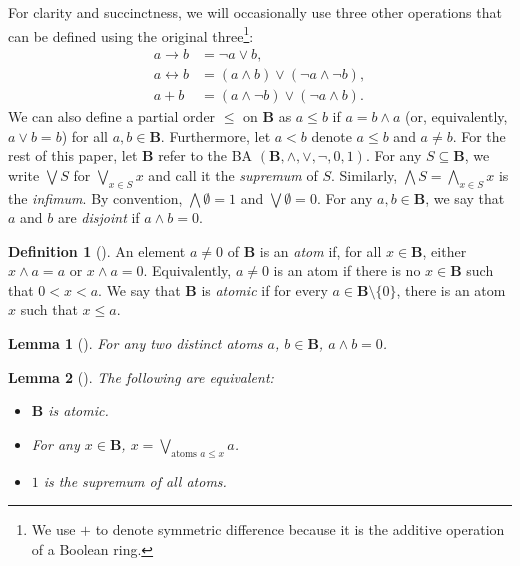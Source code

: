 \documentclass{article}
\newtheorem{lemma}{Lemma}
\theoremstyle{definition}
\newtheorem{definition}{Definition}
\theoremstyle{remark}
\begin{document}
For clarity and succinctness, we will occasionally use three other operations
that can be defined using the original three\footnote{We use $+$ to denote
  symmetric difference because it is the additive operation of a Boolean ring.}:
\begin{align*}
  a \to b &= \neg a \lor b, \\
  a \leftrightarrow b &= (a \land b) \lor (\neg a \land \neg b), \\
  a + b &= (a \land \neg b) \lor (\neg a \land b).
\end{align*}
We can also define a partial order $\le$ on $\mathbf{B}$ as $a \le b$ if $a = b
\land a$ (or, equivalently, $a \lor b = b$) for all $a, b \in \mathbf{B}$.
Furthermore, let $a < b$ denote $a \le b$ and $a \ne b$. For the rest of this
paper, let $\mathbf{B}$ refer to the BA $(\mathbf{B}, \land, \lor, \neg, 0, 1)$.
For any $S \subseteq \mathbf{B}$, we write $\bigvee S$ for $\bigvee_{x \in S} x$
and call it the \emph{supremum} of $S$. Similarly, $\bigwedge S = \bigwedge_{x
  \in S} x$ is the \emph{infimum}. By convention, $\bigwedge \emptyset = 1$ and
$\bigvee \emptyset = 0$. For any $a, b \in \mathbf{B}$, we say that $a$ and $b$
are \emph{disjoint} if $a \land b = 0$.

\begin{definition}[\cite{DBLP:books/daglib/0090259,levasseur2012applied}]
  An element $a \ne 0$ of $\mathbf{B}$ is an \emph{atom} if, for all $x \in
  \mathbf{B}$, either $x \land a = a$ or $x \land a = 0$. Equivalently, $a \ne
  0$ is an atom if there is no $x \in \mathbf{B}$ such that $0 < x < a$. We say
  that $\mathbf{B}$ is \emph{atomic} if for every $a \in \mathbf{B} \setminus \{0
  \}$, there is an atom $x$ such that $x \le a$.
\end{definition}

\begin{lemma}[\cite{ganesh2006introduction}]
  For any two distinct atoms $a$, $b \in \mathbf{B}$, $a \land b = 0$.
\end{lemma}

\begin{lemma}[\cite{givant2008introduction}] \label{thm:representation}
  The following are equivalent:
  \begin{itemize}
  \item $\mathbf{B}$ is atomic.
  \item For any $x \in \mathbf{B}$, $x = \bigvee_{\text{atoms } a \le x} a$.
  \item $1$ is the supremum of all atoms.
  \end{itemize}
\end{lemma}
\end{document}
